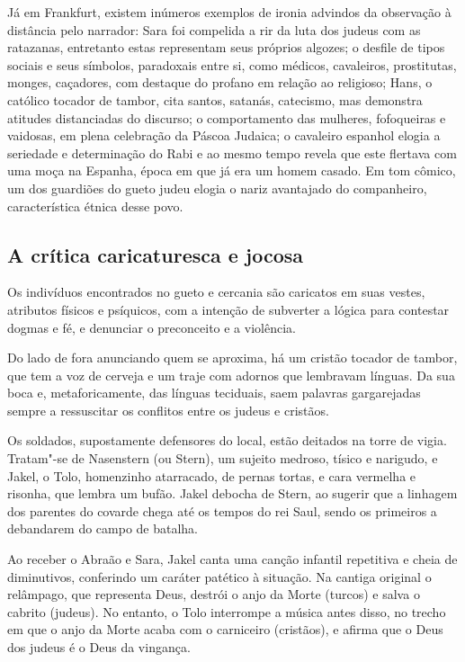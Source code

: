 \documentclass[12pt]{extarticle}
\begin{document}
Já em Frankfurt, existem inúmeros exemplos de ironia advindos da
observação à distância pelo narrador: Sara foi compelida a rir da luta
dos judeus com as ratazanas, entretanto estas representam seus próprios
algozes; o desfile de tipos sociais e seus símbolos, paradoxais entre
si, como médicos, cavaleiros, prostitutas, monges, caçadores, com
destaque do profano em relação ao religioso; Hans, o católico tocador de
tambor, cita santos, satanás, catecismo, mas demonstra atitudes
distanciadas do discurso; o comportamento das mulheres, fofoqueiras e
vaidosas, em plena celebração da Páscoa Judaica; o cavaleiro espanhol
elogia a seriedade e determinação do Rabi e ao mesmo tempo revela que
este flertava com uma moça na Espanha, época em que já era um homem
casado. Em tom cômico, um dos guardiões do gueto judeu elogia o nariz
avantajado do companheiro, característica étnica desse povo.

\subsection{A crítica caricaturesca e jocosa }

Os indivíduos encontrados no gueto e cercania são caricatos em suas
vestes, atributos físicos e psíquicos, com a intenção de subverter a
lógica para contestar dogmas e fé, e denunciar o preconceito e a
violência.

Do lado de fora anunciando quem se aproxima, há um cristão tocador de
tambor, que tem a voz de cerveja e um traje com adornos que lembravam
línguas. Da sua boca e, metaforicamente, das línguas teciduais, saem
palavras gargarejadas sempre a ressuscitar os conflitos entre os judeus
e cristãos.

Os soldados, supostamente defensores do local, estão deitados na torre
de vigia. Tratam"-se de Nasenstern (ou Stern), um sujeito medroso, tísico
e narigudo, e Jakel, o Tolo, homenzinho atarracado, de pernas tortas, e
cara vermelha e risonha, que lembra um bufão. Jakel debocha de Stern, ao
sugerir que a linhagem dos parentes do covarde chega até os tempos do
rei Saul, sendo os primeiros a debandarem do campo de batalha.

Ao receber o Abraão e Sara, Jakel canta uma canção infantil repetitiva e
cheia de diminutivos, conferindo um caráter patético à situação. Na
cantiga original o relâmpago, que representa Deus, destrói o anjo da
Morte (turcos) e salva o cabrito (judeus). No entanto, o Tolo interrompe
a música antes disso, no trecho em que o anjo da Morte acaba com o
carniceiro (cristãos), e afirma que o Deus dos judeus é o Deus da
vingança.
\end{document}
